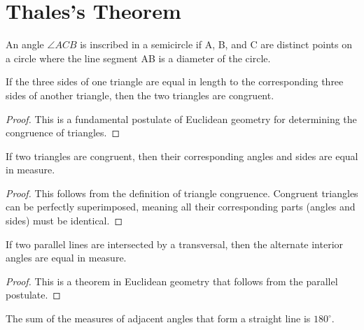 \chapter{Thales's Theorem}

\begin{definition}
    \label{def:Angle_Inscribed_in_a_Semicircle}
    An angle $\angle ACB$ is inscribed in a semicircle if A, B, and C are distinct points on a circle where the line segment AB is a diameter of the circle.
\end{definition}

\begin{lemma}
    \label{lem:SSS_Congruence}
    If the three sides of one triangle are equal in length to the corresponding three sides of another triangle, then the two triangles are congruent.
\end{lemma}

\begin{proof}
    This is a fundamental postulate of Euclidean geometry for determining the congruence of triangles.
\end{proof}

\begin{lemma}
    \label{lem:CPCTC}
    If two triangles are congruent, then their corresponding angles and sides are equal in measure.
\end{lemma}

\begin{proof}
    This follows from the definition of triangle congruence. Congruent triangles can be perfectly superimposed, meaning all their corresponding parts (angles and sides) must be identical.
\end{proof}

\begin{lemma}
    \label{lem:Alternate_Interior_Angles}
    If two parallel lines are intersected by a transversal, then the alternate interior angles are equal in measure.
\end{lemma}

\begin{proof}
    This is a theorem in Euclidean geometry that follows from the parallel postulate.
\end{proof}

\begin{lemma}
    \label{lem:Angles_on_a_Straight_Line}
    The sum of the measures of adjacent angles that form a straight line is $180^\circ$.
\end{lemma}

